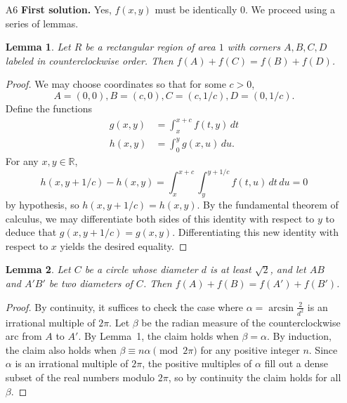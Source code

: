 \documentclass[amssymb,twocolumn,pra,10pt,aps]{revtex4-1}
\newtheorem{lemma}{Lemma}
\newcommand{\RR}{\mathbb{R}}
\begin{document}
\begin{itemize}
In other words, the matrix $N = M-I$ is nilpotent; consequently, $N^n = 0$.
For any positive integer $k$, we have
\begin{align*}
G^{(k)}(0) &= v + Mv + \cdots + M^{k-1}v \\
&=  \sum_{j=0}^{k-1}  \sum_{i=0}^{n-1} \binom{j}{i} N^i v \\
&= \sum_{i=0}^{n-1} \binom{k}{i+1} N^i v.
\end{align*}
If $n \geq 2$ and $(p,n) \neq (2,2)$, then $p^{n-1} > n$ and so $G^{k}(0) = 0$ for $k = p^{n-1}$ (because all
of the binomial coefficients are divisible by $p$). This contradiction
completes the proof.

\item[A6]
\textbf{First solution.}
Yes, $f(x,y)$ must be identically 0. We proceed using a series of lemmas.

\setcounter{lemma}{0}
\begin{lemma}
Let $R$ be a rectangular region of area $1$ with corners $A,B,C,D$ labeled in counterclockwise order. Then
$f(A) + f(C) = f(B) + f(D)$.
\end{lemma}
\begin{proof}
We may choose coordinates so that for some $c>0$,
\[
A = (0,0), B = (c,0), C = (c,1/c), D = (0, 1/c).
\]
Define the functions
\begin{align*}
g(x,y) &= \int_x^{x+c} f(t,y)\,dt \\
h(x,y) &= \int_0^y g(x,u)\,du.
\end{align*}
For any $x,y \in \RR$,
\[
h(x,y+1/c) - h(x,y) = \int_x^{x+c} \int_y^{y+1/c} f(t,u)\,dt\,du = 0
\]
by hypothesis, so $h(x,y+1/c) = h(x,y)$. By the fundamental theorem of calculus,
we may differentiate both sides of this identity with respect to $y$ to deduce that
$g(x,y+1/c) = g(x,y)$. Differentiating this new identity with respect to $x$ yields the desired equality.
\end{proof}

\begin{lemma}
Let $C$ be a circle whose diameter $d$ is at least $\sqrt{2}$, and let $AB$ and $A'B'$ be two diameters of $C$. Then
$f(A) + f(B) = f(A') + f(B')$.
\end{lemma}
\begin{proof}
By continuity, it suffices to check the case where $\alpha = \arcsin \frac{2}{d^2}$
is an irrational multiple of $2\pi$.
Let $\beta$ be the radian measure of the counterclockwise arc from $A$ to $A'$.
By Lemma~1, the claim holds when $\beta = \alpha$. By induction, the claim also holds when $\beta \equiv n\alpha
\pmod{2\pi}$ for any positive integer $n$. Since $\alpha$ is an irrational multiple of $2\pi$, the positive multiples of $\alpha$ fill out a dense subset of the real numbers modulo $2\pi$,
so by continuity the claim holds for all $\beta$.
\end{proof}


\end{itemize}
\end{document}
